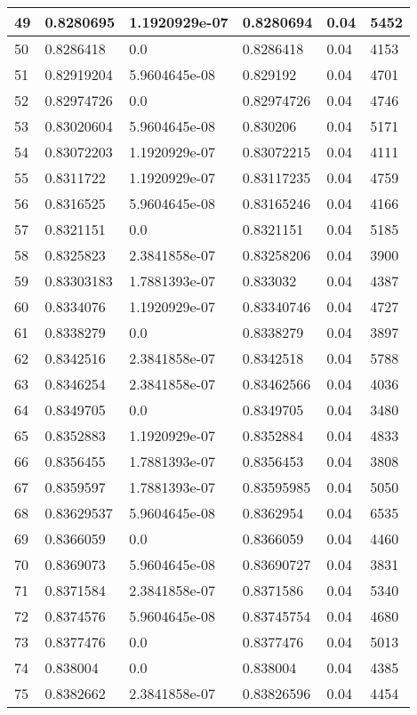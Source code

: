\begin{longtable}{|l|l|l|l|l|l|}
49 & 0.8280695 & 1.1920929e-07 & 0.8280694 & 0.04 & 5452 \\ \hline 
50 & 0.8286418 & 0.0 & 0.8286418 & 0.04 & 4153 \\ \hline 
51 & 0.82919204 & 5.9604645e-08 & 0.829192 & 0.04 & 4701 \\ \hline 
52 & 0.82974726 & 0.0 & 0.82974726 & 0.04 & 4746 \\ \hline 
53 & 0.83020604 & 5.9604645e-08 & 0.830206 & 0.04 & 5171 \\ \hline 
54 & 0.83072203 & 1.1920929e-07 & 0.83072215 & 0.04 & 4111 \\ \hline 
55 & 0.8311722 & 1.1920929e-07 & 0.83117235 & 0.04 & 4759 \\ \hline 
56 & 0.8316525 & 5.9604645e-08 & 0.83165246 & 0.04 & 4166 \\ \hline 
57 & 0.8321151 & 0.0 & 0.8321151 & 0.04 & 5185 \\ \hline 
58 & 0.8325823 & 2.3841858e-07 & 0.83258206 & 0.04 & 3900 \\ \hline 
59 & 0.83303183 & 1.7881393e-07 & 0.833032 & 0.04 & 4387 \\ \hline 
60 & 0.8334076 & 1.1920929e-07 & 0.83340746 & 0.04 & 4727 \\ \hline 
61 & 0.8338279 & 0.0 & 0.8338279 & 0.04 & 3897 \\ \hline 
62 & 0.8342516 & 2.3841858e-07 & 0.8342518 & 0.04 & 5788 \\ \hline 
63 & 0.8346254 & 2.3841858e-07 & 0.83462566 & 0.04 & 4036 \\ \hline 
64 & 0.8349705 & 0.0 & 0.8349705 & 0.04 & 3480 \\ \hline 
65 & 0.8352883 & 1.1920929e-07 & 0.8352884 & 0.04 & 4833 \\ \hline 
66 & 0.8356455 & 1.7881393e-07 & 0.8356453 & 0.04 & 3808 \\ \hline 
67 & 0.8359597 & 1.7881393e-07 & 0.83595985 & 0.04 & 5050 \\ \hline 
68 & 0.83629537 & 5.9604645e-08 & 0.8362954 & 0.04 & 6535 \\ \hline 
69 & 0.8366059 & 0.0 & 0.8366059 & 0.04 & 4460 \\ \hline 
70 & 0.8369073 & 5.9604645e-08 & 0.83690727 & 0.04 & 3831 \\ \hline 
71 & 0.8371584 & 2.3841858e-07 & 0.8371586 & 0.04 & 5340 \\ \hline 
72 & 0.8374576 & 5.9604645e-08 & 0.83745754 & 0.04 & 4680 \\ \hline 
73 & 0.8377476 & 0.0 & 0.8377476 & 0.04 & 5013 \\ \hline 
74 & 0.838004 & 0.0 & 0.838004 & 0.04 & 4385 \\ \hline 
75 & 0.8382662 & 2.3841858e-07 & 0.83826596 & 0.04 & 4454 \\ \hline 
\end{longtable}